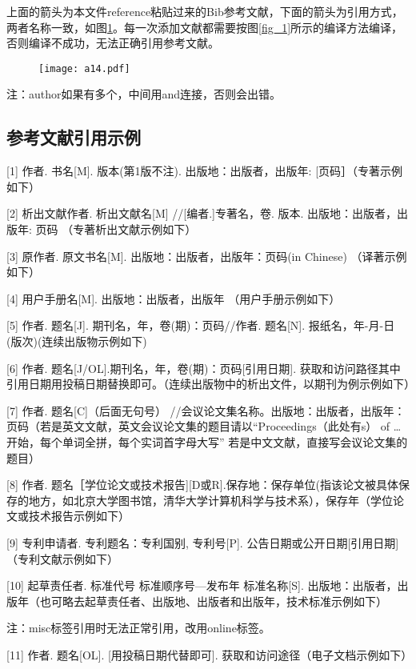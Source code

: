 \documentclass{standalone}
\begin{document}
上面的箭头为本文件reference粘贴过来的Bib参考文献，下面的箭头为引用方式，两者名称一致，如图\ref{fig_12}。每一次添加文献都需要按图\ref{fig_1}所示的编译方法编译，否则编译不成功，无法正确引用参考文献。
\begin{figure}[htbp]
	\centering
	\texttt{[image: a14.pdf]}
	\label{fig_12}
\end{figure}

注：author如果有多个，中间用and连接，否则会出错。



\subsection{参考文献引用示例}
[1]	作者. 书名[M].  版本(第1版不注). 出版地：出版者，出版年: [页码］（专著示例如下）\cite{Mawhorter2021}

[2]	析出文献作者. 析出文献名[M] //[编者.]专著名，卷. 版本. 出版地：出版者，出版年: 页码 （专著析出文献示例如下） \cite{Subramaniam2016}

[3]	原作者. 原文书名[M]. 出版地：出版者，出版年：页码(in Chinese) （译著示例如下） \cite{ref_1}

[4]	用户手册名[M]. 出版地：出版者，出版年 （用户手册示例如下） \cite{ref_2}

[5]	作者. 题名[J]. 期刊名，年，卷(期)：页码//作者. 题名[N]. 报纸名，年-月-日(版次)(连续出版物示例如下) \cite{ref_3}

[6]	作者. 题名[J/OL].期刊名，年，卷(期)：页码[引用日期]. 获取和访问路径其中引用日期用投稿日期替换即可。（连续出版物中的析出文件，以期刊为例示例如下） \cite{ref_4}

[7]	作者. 题名[C]（后面无句号） //会议论文集名称。出版地：出版者，出版年：页码（若是英文文献，英文会议论文集的题目请以“Proceedings（此处有s） of …开始，每个单词全拼，每个实词首字母大写” 若是中文文献，直接写会议论文集的题目） \cite{ref_5}

[8]	作者. 题名［学位论文或技术报告][D或R].保存地：保存单位(指该论文被具体保存的地方，如北京大学图书馆，清华大学计算机科学与技术系），保存年（学位论文或技术报告示例如下） \cite{Anderson1998}

[9]	专利申请者. 专利题名：专利国别, 专利号[P]. 公告日期或公开日期[引用日期]（专利文献示例如下） \cite{ref_6}

[10]	起草责任者.  标准代号 标准顺序号—发布年  标准名称[S]. 出版地：出版者，出版年（也可略去起草责任者、出版地、出版者和出版年，技术标准示例如下） \cite{ref_7}

注：misc标签引用时无法正常引用，改用online标签。

[11]	作者. 题名[OL]. [用投稿日期代替即可]. 获取和访问途径（电子文档示例如下） \cite{Baskaran2008}
\end{document}

